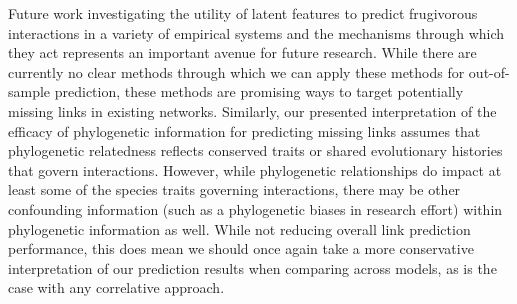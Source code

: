 Future work investigating the utility of latent features to predict frugivorous interactions in a variety of empirical systems and the mechanisms through which they act represents an important avenue for future research. While there are currently no clear methods through which we can apply these methods for out-of-sample prediction, these methods are promising ways to target potentially missing links in existing networks. Similarly, our presented interpretation of the efficacy of phylogenetic information for predicting missing links assumes that phylogenetic relatedness reflects conserved traits or shared evolutionary histories that govern interactions. However, while phylogenetic relationships do impact at least some of the species traits governing interactions, there may be other confounding information (such as a phylogenetic biases in research effort) within phylogenetic information as well. While not reducing overall link prediction performance, this does mean we should once again take a more conservative interpretation of our prediction results when comparing across models, as is the case with any correlative approach. 

